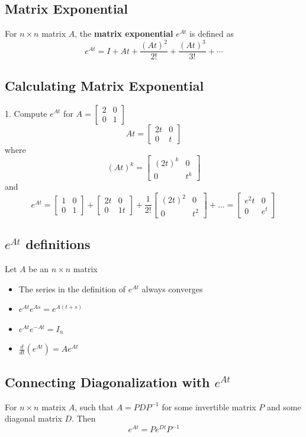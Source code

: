 \begin{enumerate}
\section{Matrix Exponential}
For $n \times n$ matrix $A$, the \textbf{matrix exponential}
$e^{At}$ is defined as 
\[
  e^{At} = I + At + \frac{(At)^2}{2!} + \frac{(At)^3}{3!} + \cdots
\]
\subsection{Calculating Matrix Exponential}
1. Compute $e^{At}$ for $A = \begin{bmatrix} 2 & 0 \\ 0 & 1 \end{bmatrix}$
\[
  At = \begin{bmatrix} 2t & 0 \\ 0 & t \end{bmatrix}
\]
where 
\[
  (At)^k = \begin{bmatrix} (2t)^k & 0 \\ 0 & t^k \end{bmatrix}
\] and 
\[
  e^{At} = \begin{bmatrix} 1 & 0 \\ 0 & 1 \end{bmatrix} + 
  \begin{bmatrix} 2t & 0 \\ 0 & 1t \end{bmatrix} + 
  \frac{1}{2!} \begin{bmatrix} (2t)^2 & 0 \\ 0 & t^2 
    \end{bmatrix} + \dots = \begin{bmatrix} e^2t & 0 \\ 
  0 & e^t \end{bmatrix}
\]
\subsection{$e^{At}$ definitions}
Let $A$ be an $n \times n$ matrix 
\begin{itemize}
  \item The series in the definition of $e^{At}$ always converges 
  \item $e^{At}e^{As} = e^{A(t + s)}$ 
  \item $e^{At}e^{-At} = I_n$
  \item $\frac{d}{dt}(e^{At}) = Ae^{At}$
\end{itemize}
\subsection{Connecting Diagonalization with $e^{At}$}
For $n \times n$ matrix $A$, such that $A = PDP^{-1}$ for 
some invertible matrix $P$ and some diagonal matrix $D$. Then 
\[
  e^{At} = Pe^{Dt}P^{-1}
\]

\end{enumerate}
